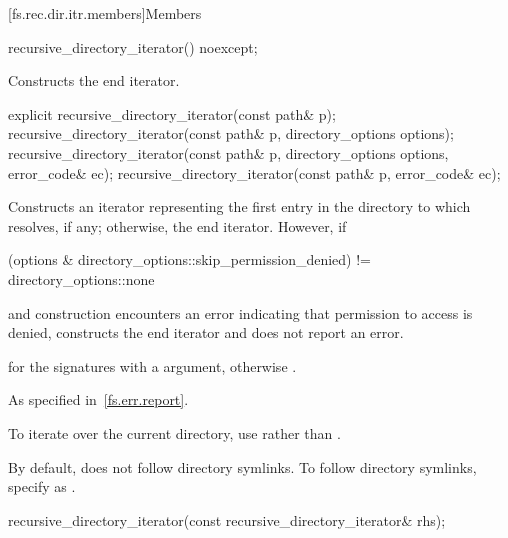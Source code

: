 [fs.rec.dir.itr.members]{Members}

%
\begin{itemdecl}
recursive_directory_iterator() noexcept;
\end{itemdecl}

\begin{itemdescr}
\pnum
\effects
Constructs the end iterator.
\end{itemdescr}

%
\begin{itemdecl}
explicit recursive_directory_iterator(const path& p);
recursive_directory_iterator(const path& p, directory_options options);
recursive_directory_iterator(const path& p, directory_options options, error_code& ec);
recursive_directory_iterator(const path& p, error_code& ec);
\end{itemdecl}

\begin{itemdescr}
\pnum
\effects
Constructs an iterator representing the first
entry in the directory to which  resolves, if any; otherwise, the end iterator.
However, if
\begin{codeblock}
(options & directory_options::skip_permission_denied) != directory_options::none
\end{codeblock}
and construction encounters an error indicating
that permission to access  is denied, constructs the end iterator
and does not report an error.

\pnum
\ensures
{} for the signatures with a
 argument, otherwise .

\pnum
\throws
As specified in~\ref{fs.err.report}.

\pnum
\begin{note}
To iterate over the current directory, use 
 rather than .
\end{note}

\pnum
\begin{note}
By default,  does not
follow directory symlinks. To follow directory symlinks, specify  as
.
\end{note}
\end{itemdescr}

%
\begin{itemdecl}
recursive_directory_iterator(const recursive_directory_iterator& rhs);
\end{itemdecl}

